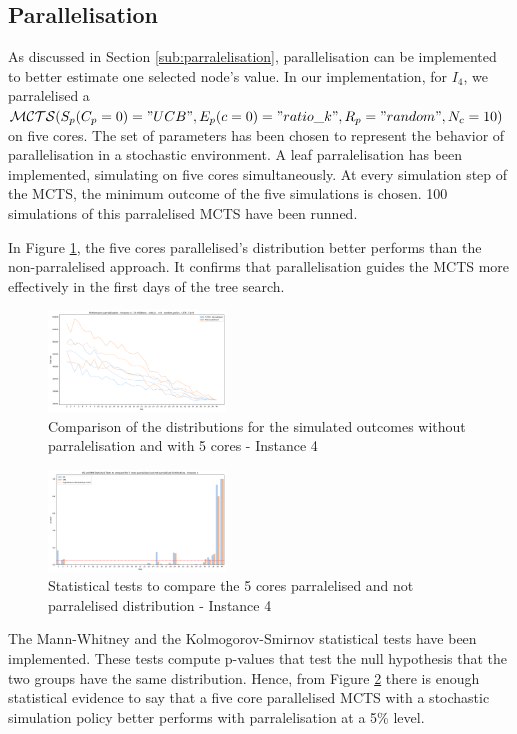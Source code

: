 \documentclass[conference]{IEEEtran}
\begin{document}
\subsection{Parallelisation}
As discussed in Section \ref{sub:parralelisation}, parallelisation can be implemented to better estimate one selected node's value.
In our implementation, for $I_4$, we parralelised a $\mathcal{MCTS}(S_p(C_p=0)="UCB",E_p(c=0)="ratio\_k",R_p="random",N_c=10)$ on five cores. The set of parameters has been chosen to represent the behavior of parallelisation in a stochastic environment.  A leaf parralelisation has been implemented, simulating on five cores simultaneously. At every simulation step of the MCTS, the minimum outcome of the five simulations is chosen. 100 simulations of this parralelised MCTS have been runned.

In Figure \ref{fig:sim_perf_parral_4}, the five cores parallelised's distribution better performs than the non-parralelised approach. It confirms that parallelisation guides the MCTS more effectively in the first days of the tree search.

\begin{figure}[!ht]
    \centering
    \includegraphics[width=0.42\textwidth]{Figures/4 - Paralelised vs 5 CPU paralelised.png}
    \caption{Comparison of the distributions for the simulated outcomes without parralelisation and with 5 cores - Instance 4}
    \label{fig:sim_perf_parral_4}
\end{figure}

\begin{figure}[!ht]
    \centering
    \includegraphics[width=0.42\textwidth]{Figures/Distribution stats tests P vs NP.png}
    \caption{Statistical tests to compare the 5 cores parralelised and not parralelised distribution - Instance 4}
    \label{fig:stats test parralel}
\end{figure}
The Mann-Whitney and the Kolmogorov-Smirnov statistical tests have been implemented. These tests compute p-values that test the null hypothesis that the two groups have the same distribution. Hence, from Figure \ref{fig:stats test parralel} there is enough statistical evidence to say that a five core parallelised MCTS with a stochastic simulation policy better performs with parralelisation at a 5\% level.
\end{document}
